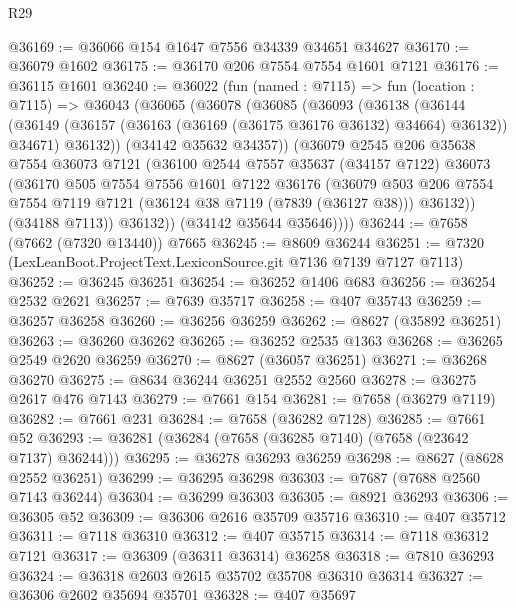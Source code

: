 \begin{lexlean}{R29}
\begin{coremodule}
@36169 := @36066 @154 @1647 @7556 @34339 @34651 @34627
@36170 := @36079 @1602
@36175 := @36170 @206 @7554 @7554 @1601 @7121
@36176 := @36115 @1601
@36240 := @36022
    (fun (named : @7115) =>
    fun (location : @7115) =>
    @36043
      (@36065
        (@36078
          (@36085
            (@36093
              (@36138
                (@36144
                  (@36149 (@36157 (@36163 (@36169 (@36175 @36176 @36132) @34664) @36132)) @34671)
                  @36132))
              (@34142 @35632 @34357))
            (@36079
              @2545
              @206
              @35638
              @7554
              @36073
              @7121
              (@36100
                @2544
                @7557
                @35637
                (@34157 @7122)
                @36073
                (@36170
                  @505
                  @7554
                  @7556
                  @1601
                  @7122
                  @36176
                  (@36079
                    @503
                    @206
                    @7554
                    @7554
                    @7119
                    @7121
                    (@36124 @38 @7119 (@7839 (@36127 @38)))
                    @36132))
                (@34188 @7113))
              @36132))
          (@34142 @35644 @35646))))
@36244 := @7658 (@7662 (@7320 @13440)) @7665
@36245 := @8609 @36244
@36251 := @7320 (LexLeanBoot.ProjectText.LexiconSource.git @7136 @7139 @7127 @7113)
@36252 := @36245 @36251
@36254 := @36252 @1406 @683
@36256 := @36254 @2532 @2621
@36257 := @7639 @35717
@36258 := @407 @35743
@36259 := @36257 @36258
@36260 := @36256 @36259
@36262 := @8627 (@35892 @36251)
@36263 := @36260 @36262
@36265 := @36252 @2535 @1363
@36268 := @36265 @2549 @2620 @36259
@36270 := @8627 (@36057 @36251)
@36271 := @36268 @36270
@36275 := @8634 @36244 @36251 @2552 @2560
@36278 := @36275 @2617 @476 @7143
@36279 := @7661 @154
@36281 := @7658 (@36279 @7119)
@36282 := @7661 @231
@36284 := @7658 (@36282 @7128)
@36285 := @7661 @52
@36293 := @36281 (@36284 (@7658 (@36285 @7140) (@7658 (@23642 @7137) @36244)))
@36295 := @36278 @36293 @36259
@36298 := @8627 (@8628 @2552 @36251)
@36299 := @36295 @36298
@36303 := @7687 (@7688 @2560 @7143 @36244)
@36304 := @36299 @36303
@36305 := @8921 @36293
@36306 := @36305 @52
@36309 := @36306 @2616 @35709 @35716
@36310 := @407 @35712
@36311 := @7118 @36310
@36312 := @407 @35715
@36314 := @7118 @36312 @7121
@36317 := @36309 (@36311 @36314) @36258
@36318 := @7810 @36293
@36324 := @36318 @2603 @2615 @35702 @35708 @36310 @36314
@36327 := @36306 @2602 @35694 @35701
@36328 := @407 @35697

\end{coremodule}
\end{lexlean}
